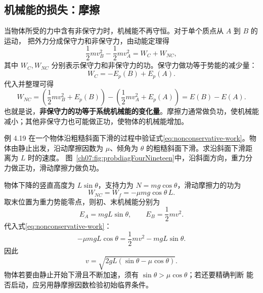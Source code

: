 \subsection{机械能的损失：摩擦}

当物体所受的力中含有非保守力时，机械能不再守恒。对于单个质点从 $A$ 到 $B$ 的运动，
把外力分成保守力和非保守力，由动能定理得
\begin{equation}
 \frac12mv_B^2-\frac12mv_A^2=W_C+W_{NC},
\end{equation}
其中 $W_C,W_{NC}$ 分别表示保守力和非保守力的功。保守力做功等于势能的减少量：
\begin{equation}
 W_C=-E_p(B)+E_p(A).
\end{equation}
代入并整理可得
\begin{equation}\label{eq:nonconservative-work}
 W_{NC}
 =\left(\frac12mv_B^2+E_p(B)\right)
  -\left(\frac12mv_A^2+E_p(A)\right)
 =E(B)-E(A).
\end{equation}
也就是说，\textbf{非保守力的功等于系统机械能的变化量}。摩擦力通常做负功，使机械能
减小；其他非保守力也可能做正功，使物体的机械能增加。

\Needspace{0.28\textheight}
\begin{origexamplebox}{例 4.19}
在一个物体沿粗糙斜面下滑的过程中验证式\eqref{eq:nonconservative-work}。物体由静止出发，沿动摩擦因数为
$\mu$、倾角为 $\theta$ 的粗糙斜面下滑。求沿斜面下滑距离为 $L$ 时的速度。
图~\ref{ch07:fig:probdiagFourNineteen}中，沿斜面方向，重力分力做正功，滑动摩擦力做负功。
\probdiagFourNineteen
\end{origexamplebox}

\begin{xesolution}
物体下降的竖直高度为 $L\sin\theta$，支持力为 $N=mg\cos\theta$，滑动摩擦力的功为
\[
 W_{NC}=W_f=-\mu mg\cos\theta\,L.
\]
取末位置为重力势能零点，则初、末机械能分别为
\[
 E_A=mgL\sin\theta,
 \qquad
 E_B=\frac12mv^2.
\]
代入式\eqref{eq:nonconservative-work}：
\[
 -\mu mgL\cos\theta
 =\frac12mv^2-mgL\sin\theta.
\]
因此
\[
 \boxed{v=\sqrt{2gL(\sin\theta-\mu\cos\theta)}}.
\]
物体若要由静止开始下滑且不断加速，须有 $\sin\theta>\mu\cos\theta$；若还要精确判断
能否启动，应另用静摩擦因数检验初始临界条件。
\end{xesolution}

